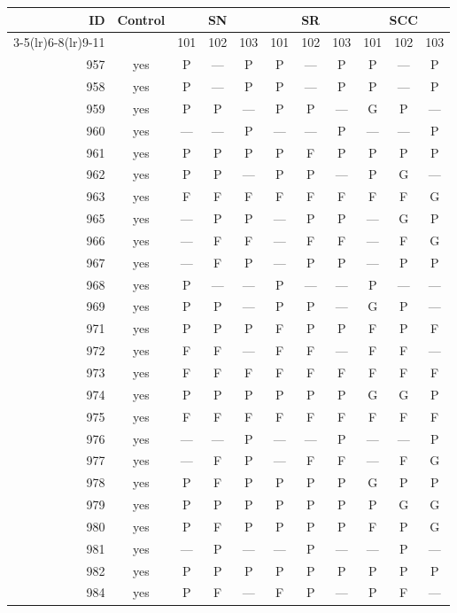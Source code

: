 \begin{table}[p]\centering\small
\begin{tabular*}{\textwidth}{@{\extracolsep{\fill}}rc*{9}{c}@{}}\toprule
ID & Control & \multicolumn{3}{c}{SN} & \multicolumn{3}{c}{SR} & \multicolumn{3}{c}{SCC}\\
\cmidrule(lr){3-5}\cmidrule(lr){6-8}\cmidrule(lr){9-11}
 & & 101 & 102 & 103 & 101 & 102 & 103 & 101 & 102 & 103\\\midrule
957 & yes & P & — & P & P & — & P & P & — & P\\
958 & yes & P & — & P & P & — & P & P & — & P\\
959 & yes & P & P & — & P & P & — & G & P & —\\
960 & yes & — & — & P & — & — & P & — & — & P\\
961 & yes & P & P & P & P & F & P & P & P & P\\
962 & yes & P & P & — & P & P & — & P & G & —\\
963 & yes & F & F & F & F & F & F & F & F & G\\
965 & yes & — & P & P & — & P & P & — & G & P\\
966 & yes & — & F & F & — & F & F & — & F & G\\
967 & yes & — & F & P & — & P & P & — & P & P\\
968 & yes & P & — & — & P & — & — & P & — & —\\
969 & yes & P & P & — & P & P & — & G & P & —\\
971 & yes & P & P & P & F & P & P & F & P & F\\
972 & yes & F & F & — & F & F & — & F & F & —\\
973 & yes & F & F & F & F & F & F & F & F & F\\
974 & yes & P & P & P & P & P & P & G & G & P\\
975 & yes & F & F & F & F & F & F & F & F & F\\
976 & yes & — & — & P & — & — & P & — & — & P\\
977 & yes & — & F & P & — & F & F & — & F & G\\
978 & yes & P & F & P & P & P & P & G & P & P\\
979 & yes & P & P & P & P & P & P & P & G & G\\
980 & yes & P & F & P & P & P & P & F & P & G\\
981 & yes & — & P & — & — & P & — & — & P & —\\
982 & yes & P & P & P & P & P & P & P & P & P\\
984 & yes & P & F & — & F & P & — & P & F & —\\

\end{tabular*}
\end{table}
